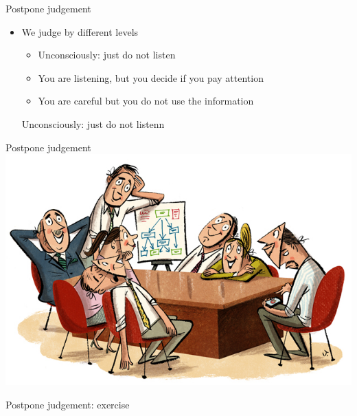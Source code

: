 \documentclass[notes]{beamer}
\begin{document}
\begin{frame}{Postpone judgement}
	\begin{itemize}
		\item We judge by different levels
		\begin{itemize}
			\item Unconsciously: just do not listen
			\item You are listening, but you decide if you pay attention
			\item You are careful but you do not use the information
		\end{itemize}
		Unconsciously: just do not listenn
	\end{itemize}
\end{frame}

\begin{frame}{Postpone judgement}
	\includegraphics[width=\textwidth]{img/group.jpg}
\end{frame}

\begin{frame}{Postpone judgement: exercise}
\end{frame}
\end{document}
